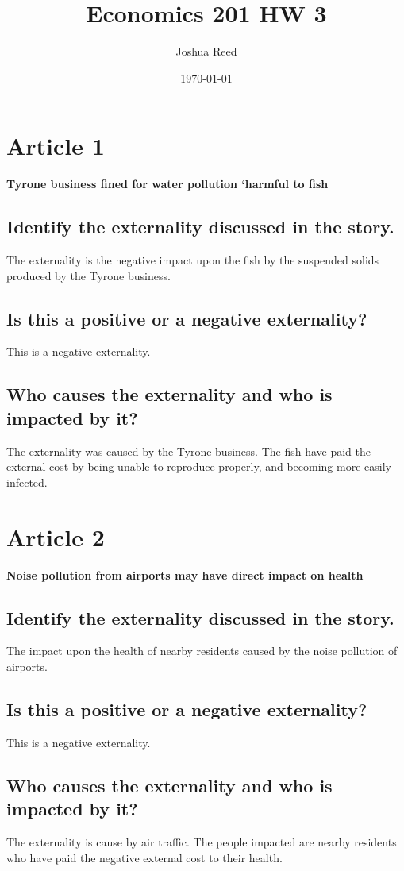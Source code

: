 \documentclass[a4paper]{article}
\title{Economics 201 HW 3}
\author{Joshua Reed}
\date{\today}
\begin{document}
\maketitle

\section{Article 1}
\textbf{Tyrone business fined for water pollution ‘harmful to fish}


\subsection{Identify the externality discussed in the story.}
The externality is the negative impact upon the fish by the suspended solids produced by the Tyrone business.

\subsection{Is this a positive or a negative externality?}
This is a negative externality.

\subsection{Who causes the externality and who is impacted by it?}
The externality was caused by the Tyrone business. The fish have paid the external cost by being unable to reproduce properly, and becoming more easily infected.



\section{Article 2}
\textbf{Noise pollution from airports may have direct impact on health}


\subsection{Identify the externality discussed in the story.}
The impact upon the health of nearby residents caused by the noise pollution of airports.

\subsection{Is this a positive or a negative externality?}
This is a negative externality.

\subsection{Who causes the externality and who is impacted by it?}
The externality is cause by air traffic. The people impacted are nearby residents who have paid the negative external cost to their health. 
\end{document}
